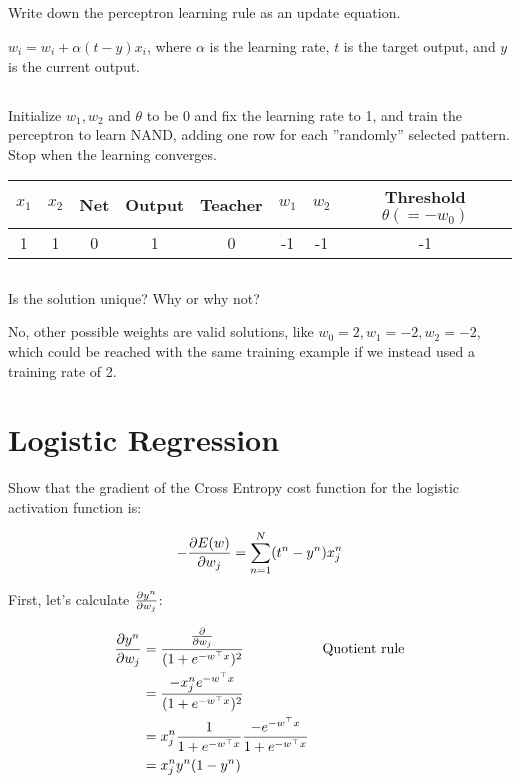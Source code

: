 \documentclass{article} %
\begin{document}
\subsection{}

Write down the perceptron learning rule as an update equation.

$w_i = w_i + \alpha (t - y) x_i$, where $\alpha$ is the learning rate, $t$ is
the target output, and $y$ is the current output.

\subsection{}

Initialize $w_1, w_2$ and $\theta$ to be 0 and fix the learning rate to 1, and
train the perceptron to learn NAND, adding one row for each ''randomly''
selected pattern. Stop when the learning converges.

\begin{tabular}{|c|c|c|c|c|c|c|c|}
  \hline
  $x_1$ & $x_2$ & Net & Output & Teacher & $w_1$ & $w_2$ & Threshold $\theta (= -w_0)$  \\ \hline
  1 & 1 & 0 & 1 & 0 & -1 & -1 & -1\\ \hline
\end{tabular}

\subsection{}

Is the solution unique? Why or why not?

No, other possible weights are valid solutions, like $w_0 = 2, w_1 = -2, w_2 =
-2$, which could be reached with the same training example if we instead used a
training rate of 2.

\section{Logistic Regression}

Show that the gradient of the Cross Entropy cost function for the logistic
activation function is:

\[
- \pdv{E(w)}{w_j} = \sum_{n=1}^{N}(t^n - y^n)x_j^n
\]

First, let's calculate $\pdv{y^n}{w_j}$:

\begin{align}
  \pdv{y^n}{w_j}
  &= \frac{\pdv{}{w_j} (1 + e^{- w^\top x})}{(1+e^{-w^\top x})^2} && \text{Quotient rule}\\
  &= \frac{- x_j^n e^{- w^\top x}}{(1+e^{-w^\top x})^2}\\
  &= x_j^n \frac{1}{1 + e^{-w^\top x}} \frac{-e^{-w^\top x}}{1 + e^{-w^\top x}}\\
  &= x_j^n y^n (1 - y^n)
\end{align}
\end{document}
